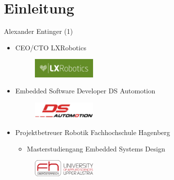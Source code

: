 \documentclass{beamer}
\begin{document}
\section{Einleitung}
\begin{frame}{Alexander Entinger (1)}
\begin{itemize}
 \item CEO/CTO LXRobotics
  \begin{figure}[H]
   \centering
   \includegraphics[width=0.3\textwidth]{./images/logo-lxrobotics.png}
   \label{fig:logo-lxrobotics}
  \end{figure}
\end{itemize}
\begin{itemize}
 \item Embedded Software Developer DS Automotion
  \begin{figure}[H]
   \centering
   \includegraphics[width=0.3\textwidth]{./images/logo-ds-automotion.jpg}
   \label{fig:logo-ds-automotion}
  \end{figure}
\end{itemize}
\begin{itemize}
 \item Projektbetreuer Robotik Fachhochschule Hagenberg
 \begin{itemize}
  \item Masterstudiengang Embedded Systems Design
 \end{itemize}
   \begin{figure}[H]
    \centering
    \includegraphics[width=0.3\textwidth]{./images/logo-fh-hagenberg.png}
    \label{fig:logo-fh-hagenberg}
   \end{figure}
\end{itemize}
\end{frame}
\end{document}
